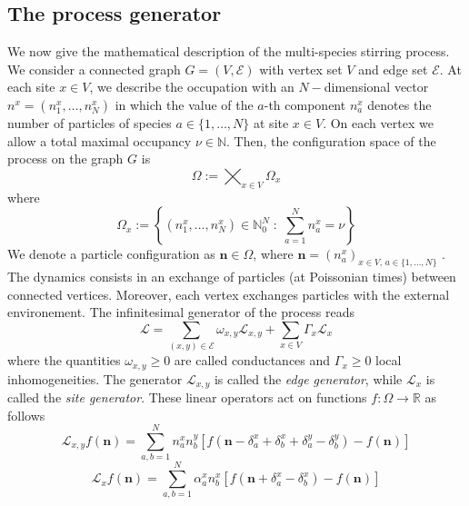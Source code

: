 \documentclass[11pt]{article}
\numberwithin{equation}{section}
\numberwithin{equation}{subsection}
\newcommand{\twoj}{\nu}
\begin{document}
\subsection{The process generator}
We now give the mathematical description of the multi-species stirring process.
We consider a connected graph $G=(V,\mathcal{E})$ with vertex set $V$ and edge set $\mathcal{E}$.
At each site $x\in V$, we describe the occupation with an $N-$dimensional vector $n^{x}=(n_{1}^{x},\ldots,n_{N}^{x})$ in which the value of the $a$-th component $n_{a}^{x}$ denotes the number of particles of species $a\in \{1,\ldots,N\}$ at site $x\in V$. On each vertex we allow a total  maximal occupancy $\nu\in \mathbb{N}$. Then, the configuration space of the process on the graph $G$ is 
\begin{equation}\label{stateSpace}
    \Omega:=\bigtimes_{x\in V} \Omega_{x}
\end{equation}
where
\begin{equation}
\Omega_{x}:=\left\{(n_{1}^{x},\ldots,n_{N}^{x})\in\mathbb{N}_0^{N}\;:\; \sum_{a=1}^{N}n_{a}^{x}=\twoj\right\}
\end{equation}
We denote a particle configuration as $\mathbf{n}\in \Omega$, where $\mathbf{n}=(n_{a}^{x})_{x\in V,\,a\in\{1,\ldots,N\}}$ .\\
The dynamics consists in an exchange of particles (at Poissonian times) between connected vertices. Moreover, each vertex  exchanges particles with the external environement. The infinitesimal generator of the process reads
\begin{equation}\label{Generator}
    \mathcal{L}=\sum_{(x,y)\in \mathcal{E}}\omega_{x,y}\mathcal{L}_{x,y}+\sum_{x\in V}\Gamma_{x}\mathcal{L}_{x}
\end{equation}
where the quantities $ \omega_{x,y}\geq 0$ are called conductances and $\Gamma_{x}\geq 0$ local inhomogeneities. The generator $\mathcal{L}_{x,y}$ is called the \textit{edge generator}, while $\mathcal{L}_{x}$ is called the \textit{site generator}. These linear operators act on functions $f:\Omega\to \mathbb{R}$ as follows
\begin{equation}\label{edgeGenerator}
\mathcal{L}_{x,y}f(\bm{n})=\sum_{a,b=1}^{N}n_{a}^{x}n_{b}^{y}\left[f(\bm{n}-\delta^{x}_{a}+\delta_{b}^{x}+\delta_{a}^{y}-\delta_{b}^{y})-f(\bm{n})\right]
\end{equation}
\begin{equation}\label{siteGenerator}
    \mathcal{L}_{x}f(\bm{n})=\sum_{a,b=1}^{N}\alpha_{a}^{x}n_{b}^{x}\left[f(\bm{n}+\delta_{a}^{x}-\delta_{b}^{x})-f(\bm{n})\right]
\end{equation}
\end{document}
